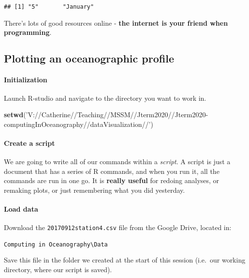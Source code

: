 \documentclass[
]{article}
\newenvironment{Shaded}{\begin{snugshade}}{\end{snugshade}}
\newcommand{\KeywordTok}[1]{\textcolor[rgb]{0.13,0.29,0.53}{\textbf{#1}}}
\newcommand{\NormalTok}[1]{#1}
\newcommand{\StringTok}[1]{\textcolor[rgb]{0.31,0.60,0.02}{#1}}
\begin{document}
\begin{verbatim}
## [1] "5"       "January"
\end{verbatim}

There's lots of good resources online - \textbf{the internet is your
friend when programming}.

\hypertarget{plotting-an-oceanographic-profile}{%
\subsection{Plotting an oceanographic
profile}\label{plotting-an-oceanographic-profile}}

\hypertarget{initialization}{%
\paragraph{Initialization}\label{initialization}}

Launch R-studio and navigate to the directory you want to work in.

\begin{Shaded}
\begin{Highlighting}[]
\KeywordTok{setwd}\NormalTok{(}\StringTok{'V://Catherine//Teaching//MSSM//Jterm2020//Jterm2020-computingInOceanography//dataVisualization//'}\NormalTok{)  }
\end{Highlighting}
\end{Shaded}

\hypertarget{create-a-script}{%
\paragraph{Create a script}\label{create-a-script}}

We are going to write all of our commands within a \emph{script}. A
script is just a document that has a series of R commands, and when you
run it, all the commands are run in one go. It is \textbf{really useful}
for redoing analyses, or remaking plots, or just remembering what you
did yesterday.

\hypertarget{load-data}{%
\paragraph{Load data}\label{load-data}}

Download the \texttt{20170912station4.csv} file from the Google Drive,
located in:

\texttt{Computing\ in\ Oceanography\textbackslash{}Data}

Save this file in the folder we created at the start of this session
(i.e.~our working directory, where our script is saved).
\end{document}
